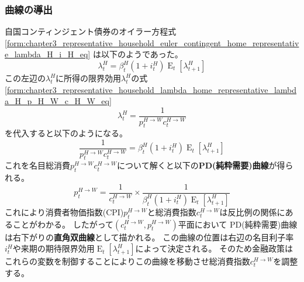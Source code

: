 \subsubsection{曲線の導出}
\label{sec:chapter5_two_plane_pd_derivation}
自国コンティンジェント債券のオイラー方程式
\eqref{form:chapter3_representative_household_euler_contingent_home_representative_lambda_H_i_H_eq}
は以下のようであった。
\begin{equation}
\label{form:chapter3_representative_household_euler_contingent_home_representative_lambda_H_i_H_eq}
    \lambda_t^H=\beta_t^H(1+i_t^H)\operatorname{E}_t[\lambda_{t+1}^H]
\end{equation}
この左辺の\(\lambda_t^H\)に所得の限界効用\(\lambda_t^H\)の式
\eqref{form:chapter3_representative_household_lambda_home_representative_lambda_H_p_H_W_c_H_W_eq}
\begin{equation}
\label{form:chapter3_representative_household_lambda_home_representative_lambda_H_p_H_W_c_H_W_eq}
    \lambda_t^H=\frac{1}{p_t^{H\to W}c_t^{H\to W}}
\end{equation}
を代入すると以下のようになる。
\begin{equation}
\label{form:chapter5_two_plane_pd_derivation_p_H_W_c_H_W_eq}
    \frac{1}{p_t^{H\to W}c_t^{H\to W}}=\beta_t^H(1+i_t^H)\operatorname{E}_t[\lambda_{t+1}^H]
\end{equation}
これを名目総消費\(p_t^{H\to W}c_t^{H\to W}\)について解くと以下の\textbf{PD(純粋需要)曲線}が得られる。
\begin{equation}
\label{form:chapter5_two_plane_pd_derivation_p_H_W_c_H_W_modified_eq}
    p_t^{H\to W}=\frac{1}{c_t^{H\to W}}\times\frac{1}{\beta_t^H(1+i_t^H)\operatorname{E}_t[\lambda_{t+1}^H]}
\end{equation}
これにより消費者物価指数(CPI)\(p_t^{H\to W}\)と総消費指数\(c_t^{H\to W}\)は反比例の関係にあることがわかる。
したがって\((c_t^{H\to W},p_t^{H\to W})\)平面において
PD(純粋需要)曲線は右下がりの\textbf{直角双曲線}として描かれる。
この曲線の位置は右辺の名目利子率\(i_t^H\)や来期の期待限界効用\(\operatorname{E}_t[\lambda_{t+1}^H]\)によって決定される。
そのため金融政策はこれらの変数を制御することによりこの曲線を移動させ総消費指数\(c_t^{H\to W}\)を調整する。